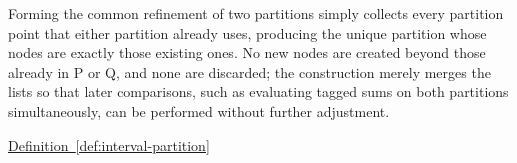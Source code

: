 \begin{remark*}[Interpretation]
Forming the common refinement of two partitions simply collects every partition point that either partition already uses, producing the unique partition whose nodes are exactly those existing ones. No new nodes are created beyond those already in P or Q, and none are discarded; the construction merely merges the lists so that later comparisons, such as evaluating tagged sums on both partitions simultaneously, can be performed without further adjustment.
\end{remark*}

\begin{dependencies}
\hyperref[def:interval-partition]{Definition~\ref*{def:interval-partition}}
\end{dependencies}
